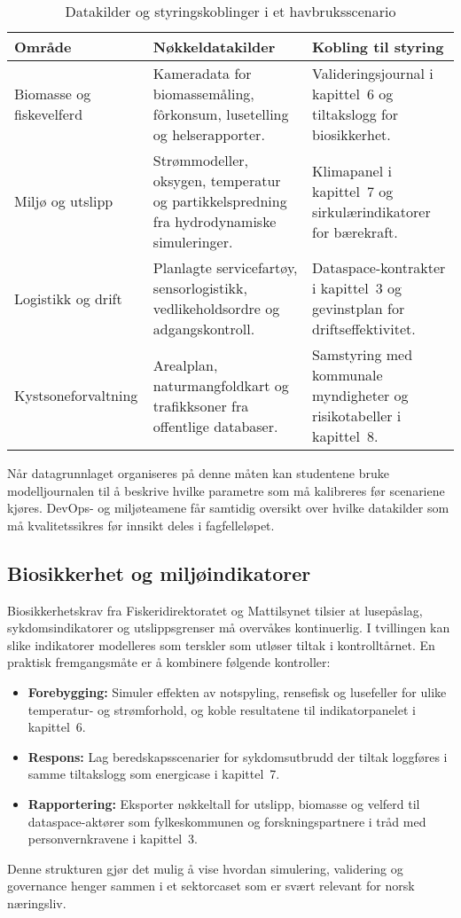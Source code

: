 \begin{table}[htbp]
    \centering
    \caption{Datakilder og styringskoblinger i et havbruksscenario}
    \label{tab:kap04-havbruk-data}
    \begin{tabular}{p{}p{}p{}}
        \toprule
        \textbf{Område} & \textbf{Nøkkeldatakilder} & \textbf{Kobling til styring}\\
        \midrule
        Biomasse og fiskevelferd & Kameradata for biomassemåling, fôrkonsum, lusetelling og helserapporter. & Valideringsjournal i kapittel~6 og tiltakslogg for biosikkerhet.\\
        Miljø og utslipp & Strømmodeller, oksygen, temperatur og partikkelspredning fra hydrodynamiske simuleringer. & Klimapanel i kapittel~7 og sirkulærindikatorer for bærekraft.\\
        Logistikk og drift & Planlagte servicefartøy, sensorlogistikk, vedlikeholdsordre og adgangskontroll. & Dataspace-kontrakter i kapittel~3 og gevinstplan for driftseffektivitet.\\
        Kystsoneforvaltning & Arealplan, naturmangfoldkart og trafikksoner fra offentlige databaser. & Samstyring med kommunale myndigheter og risikotabeller i kapittel~8.\\
        \bottomrule
    \end{tabular}
\end{table}

Når datagrunnlaget organiseres på denne måten kan studentene bruke modelljournalen til å beskrive hvilke parametre som må kalibreres før scenariene kjøres. DevOps- og miljøteamene får samtidig oversikt over hvilke datakilder som må kvalitetssikres før innsikt deles i fagfelleløpet.

\subsection{Biosikkerhet og miljøindikatorer}
Biosikkerhetskrav fra Fiskeridirektoratet og Mattilsynet tilsier at lusepåslag, sykdomsindikatorer og utslippsgrenser må overvåkes kontinuerlig.\citep{fiskeridirektoratet2024biosikkerhet,mattilsynet2023lusestrategi} I tvillingen kan slike indikatorer modelleres som terskler som utløser tiltak i kontrolltårnet. En praktisk fremgangsmåte er å kombinere følgende kontroller:
\begin{itemize}
    \item \textbf{Forebygging:} Simuler effekten av notspyling, rensefisk og lusefeller for ulike temperatur- og strømforhold, og koble resultatene til indikatorpanelet i kapittel~6.
    \item \textbf{Respons:} Lag beredskapsscenarier for sykdomsutbrudd der tiltak loggføres i samme tiltakslogg som energicase i kapittel~7.
    \item \textbf{Rapportering:} Eksporter nøkkeltall for utslipp, biomasse og velferd til dataspace-aktører som fylkeskommunen og forskningspartnere i tråd med personvernkravene i kapittel~3.
\end{itemize}
Denne strukturen gjør det mulig å vise hvordan simulering, validering og governance henger sammen i et sektorcaset som er svært relevant for norsk næringsliv.

